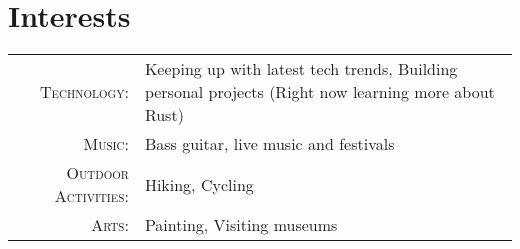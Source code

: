 %
%
%

\section{\texorpdfstring{\color{Blue}Interests}{Interests}}
\begin{tabular}{rl}
    \textsc{Technology:}         & Keeping up with latest tech trends, Building personal projects (Right now learning more about Rust) \\
    \textsc{Music:}              & Bass guitar, live music and festivals                                                               \\
    \textsc{Outdoor Activities:} & Hiking, Cycling                                                                                     \\
    \textsc{Arts:}               & Painting, Visiting museums                                                                          \\
\end{tabular}